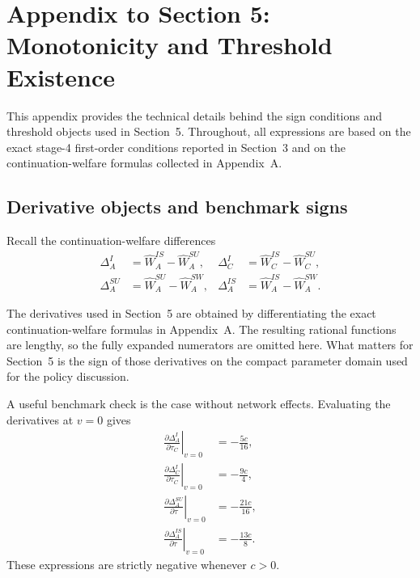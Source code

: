 \section{Appendix to Section 5: Monotonicity and Threshold Existence}

This appendix provides the technical details behind the sign conditions and
threshold objects used in Section~5. Throughout, all expressions are based on
the exact stage-4 first-order conditions reported in Section~3 and on the
continuation-welfare formulas collected in Appendix~A.

\subsection{Derivative objects and benchmark signs}

Recall the continuation-welfare differences
\begin{align}
\Delta_A^I &= \widehat W_A^{IS}-\widehat W_A^{SU}, &
\Delta_C^I &= \widehat W_C^{IS}-\widehat W_C^{SU}, \label{eq:appendix_deltas_1}\\
\Delta_A^{SU} &= \widehat W_A^{SU}-\widehat W_A^{SW}, &
\Delta_A^{IS} &= \widehat W_A^{IS}-\widehat W_A^{SW}. \label{eq:appendix_deltas_2}
\end{align}

The derivatives used in Section~5 are obtained by differentiating the exact
continuation-welfare formulas in Appendix~A. The resulting rational functions
are lengthy, so the fully expanded numerators are omitted here. What matters
for Section~5 is the sign of those derivatives on the compact parameter domain
used for the policy discussion.

A useful benchmark check is the case without network effects. Evaluating the
derivatives at $v=0$ gives
\begin{align}
\left.\frac{\partial \Delta_A^I}{\partial \tau_C}\right|_{v=0}
&= -\frac{5c}{16}, \label{eq:dAI_tauC_v0_final}\\
\left.\frac{\partial \Delta_C^I}{\partial \tau_C}\right|_{v=0}
&= -\frac{9c}{4}, \label{eq:dCI_tauC_v0_final}\\
\left.\frac{\partial \Delta_A^{SU}}{\partial \tau}\right|_{v=0}
&= -\frac{21c}{16}, \label{eq:dASU_tau_v0_final}\\
\left.\frac{\partial \Delta_A^{IS}}{\partial \tau}\right|_{v=0}
&= -\frac{13c}{8}. \label{eq:dAIS_tau_v0_final}
\end{align}
These expressions are strictly negative whenever $c>0$.

